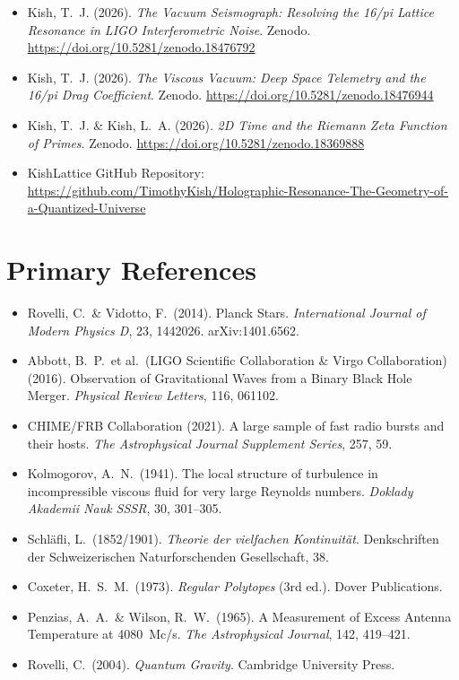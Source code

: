 \documentclass[11pt, letterpaper, openany]{book}
\begin{document}
\begin{itemize}
    \item Kish, T.~J. (2026). \textit{The Vacuum Seismograph: Resolving the 16/pi Lattice Resonance in LIGO Interferometric Noise}. Zenodo. \url{https://doi.org/10.5281/zenodo.18476792}
    \item Kish, T.~J. (2026). \textit{The Viscous Vacuum: Deep Space Telemetry and the 16/pi Drag Coefficient}. Zenodo. \url{https://doi.org/10.5281/zenodo.18476944}
    \item Kish, T.~J. \& Kish, L.~A. (2026). \textit{2D Time and the Riemann Zeta Function of Primes}. Zenodo. \url{https://doi.org/10.5281/zenodo.18369888}
    \item KishLattice GitHub Repository: \url{https://github.com/TimothyKish/Holographic-Resonance-The-Geometry-of-a-Quantized-Universe}
\end{itemize}

\section*{Primary References}
\begin{itemize}
    \item Rovelli, C.\ \& Vidotto, F.\ (2014). Planck Stars. \textit{International Journal of Modern Physics D}, 23, 1442026. arXiv:1401.6562.
    \item Abbott, B.~P.\ et al.\ (LIGO Scientific Collaboration \& Virgo Collaboration) (2016). Observation of Gravitational Waves from a Binary Black Hole Merger. \textit{Physical Review Letters}, 116, 061102.
    \item CHIME/FRB Collaboration (2021). A large sample of fast radio bursts and their hosts. \textit{The Astrophysical Journal Supplement Series}, 257, 59.
    \item Kolmogorov, A.~N.\ (1941). The local structure of turbulence in incompressible viscous fluid for very large Reynolds numbers. \textit{Doklady Akademii Nauk SSSR}, 30, 301--305.
    \item Schläfli, L.\ (1852/1901). \textit{Theorie der vielfachen Kontinuität}. Denkschriften der Schweizerischen Naturforschenden Gesellschaft, 38.
    \item Coxeter, H.~S.~M.\ (1973). \textit{Regular Polytopes} (3rd ed.). Dover Publications.
	\item Penzias, A.~A.\ \& Wilson, R.~W.\ (1965). A Measurement of Excess Antenna Temperature at 4080~Mc/s. \textit{The Astrophysical Journal}, 142, 419--421.
    \item Rovelli, C.\ (2004). \textit{Quantum Gravity}. Cambridge University Press.
\end{itemize}
\end{document}
